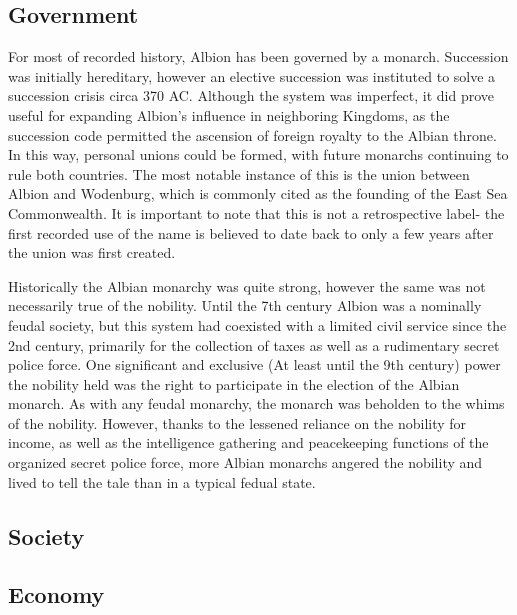 \subsection{Government}
	
	For most of recorded history, Albion has been governed by a monarch.  Succession was initially hereditary, however an elective succession was instituted to solve a succession crisis circa 370 AC.  Although the system was imperfect, it did prove useful for expanding Albion's influence in neighboring Kingdoms, as the succession code permitted the ascension of foreign royalty to the Albian throne.  In this way, personal unions could be formed, with future monarchs continuing to rule both countries.  The most notable instance of this is the union between Albion and Wodenburg, which is commonly cited as the founding of the East Sea Commonwealth.  It is important to note that this is not a retrospective label- the first recorded use of the name is believed to date back to only a few years after the union was first created.
	
	Historically the Albian monarchy was quite strong, however the same was not necessarily true of the nobility.  Until the 7th century Albion was a nominally feudal society, but this system had  coexisted with a limited civil service since the 2nd century, primarily for the collection of taxes as well as a rudimentary secret police force.  One significant and exclusive (At least until the 9th century) power the nobility held was the right to participate in the election of the Albian monarch.  As with any feudal monarchy, the monarch was beholden to the whims of the nobility.  However, thanks to the lessened reliance on the nobility for income, as well as the intelligence gathering and peacekeeping functions of the organized secret police force, more Albian monarchs angered the nobility and lived to tell the tale than in a typical fedual state.

\subsection{Society}

\subsection{Economy}